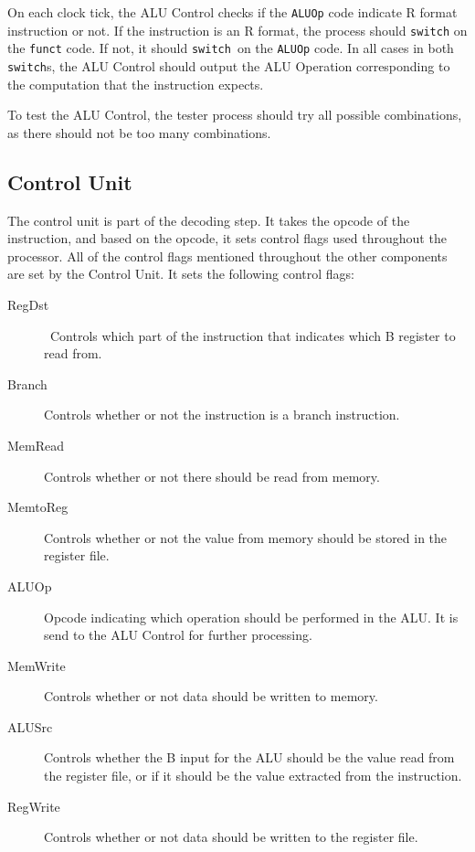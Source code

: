 On each clock tick, the ALU Control checks if the \texttt{ALUOp} code indicate
R format instruction or not. If the instruction is an R format, the process
should \texttt{switch} on the \texttt{funct} code. If not, it should
\texttt{switch} on the \texttt{ALUOp} code. In all cases in both
\texttt{switch}s, the ALU Control should output the ALU Operation corresponding
to the computation that the instruction expects.

To test the ALU Control, the tester process should try all possible
combinations, as there should not be too many combinations.

\subsection{Control Unit}
\label{sec:control-unit}
The control unit is part of the decoding step. It takes the opcode of the
instruction, and based on the opcode, it sets control flags used throughout the
processor. All of the control flags mentioned throughout the other components
are set by the Control Unit. It sets the following control flags:
\begin{description}
    \item[RegDst] Controls which part of the instruction that indicates which
        B register to read from.

    \item[Branch] Controls whether or not the instruction is a branch
        instruction.

    \item[MemRead] Controls whether or not there should be read from memory.

    \item[MemtoReg] Controls whether or not the value from memory should be
        stored in the register file.

    \item[ALUOp] Opcode indicating which operation should be performed in
        the ALU. It is send to the ALU Control for further processing.

    \item[MemWrite] Controls whether or not data should be written to memory.

    \item[ALUSrc] Controls whether the B input for the ALU should be the
        value read from the register file, or if it should be the value
        extracted from the instruction.

    \item[RegWrite] Controls whether or not data should be written to the
        register file.
\end{description}

